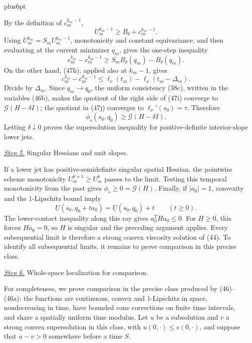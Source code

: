 \documentclass[11pt,reqno]{amsart}
\makeatletter
\theoremstyle{plain}
\theoremstyle{definition}
\theoremstyle{remark}
\renewenvironment{proof}[1][\proofname]{%
  \par
  \pushQED{\qed}%
  \normalfont
  \topsep6pt plus6pt\relax
  \trivlist
  \item[\hskip\labelsep\slshape #1\@addpunct{.}]%
  \ignorespaces
}{%
  \popQED
  \endtrivlist
  \@endpefalse
}
\DeclareRobustCommand{\qed}{%
  \leavevmode\unskip\penalty9999\hbox{}\nobreak
  \ifmmode
    \makebox[0pt][l]{\qquad\hbox{\qedsymbol}}%
  \else
    \qquad\hbox{\qedsymbol}%
  \fi
}
\renewcommand{\qedsymbol}{\rule[.47pt]{4pt}{6pt}}
\numberwithin{equation}{section}
\newcommand{\1}{\mathbf 1}
\makeatother
\begin{document}
\begin{proof}
By the definition of $c_ m^{k_ m-1}$,
\begin{equation*}
U_ m^{k_ m-1}\geq B_ \delta+c_ m^{k_ m-1}.
\end{equation*}
Using $U_ m^{k_ m}=S_ mU_ m^{k_ m-1}$, monotonicity and constant
equivariance, and then evaluating at the current minimizer $q_ m$,
gives the one-step inequality
\begin{equation}
c_ m^{k_ m}-c_ m^{k_ m-1}
\geq S_ mB_ \delta(q_ m)-B_ \delta(q_ m).
\tag{47i}
\end{equation}
On the other hand, (47h), applied also at $k_ m-1$, gives
\begin{equation}
c_ m^{k_ m}-c_ m^{k_ m-1}
\leq\ell_ \nu(t_ m)-\ell_ \nu(t_ m-\Delta_ m).
\tag{47j}
\end{equation}
Divide by $\Delta_ m$.  Since $q_ m\to q_ 0$, the uniform consistency
(38c), written in the variables (46b), makes the quotient of the
right side of (47i) converge to $\mathcal G(H-\delta I)$; the quotient
in (47j) converges to
$\ell_ \nu'(s_ 0)=\tau$.  Therefore
\begin{equation*}
\phi_ s(s_ 0,q_ 0)\geq \mathcal G(H-\delta I).
\end{equation*}
Letting $\delta\downarrow0$ proves the supersolution inequality for
positive-definite interior-slope lower jets.

\smallskip\noindent
\underline{\textit{Step 5.}} Singular Hessians and unit slopes.

If a lower jet has positive-semidefinite singular spatial Hessian, the
pointwise scheme monotonicity $U_ m^{k+1}\geq U_ m^k$ passes to the
limit.  Testing this temporal monotonicity from the past gives
$\phi_ s\geq0=\mathcal G(H)$.  Finally, if $|a_ 0|=1$, convexity and the
$1$-Lipschitz bound imply
\begin{equation*}
\underline U(s_ 0,q_ 0+ta_ 0)=\underline U(s_ 0,q_ 0)+t
\qquad(t\geq0).
\end{equation*}
The lower-contact inequality along this ray gives
$a_ 0^THa_ 0\leq0$.  For $H\geq0$, this forces $Ha_ 0=0$, so $H$
is singular and the preceding argument applies.  Every subsequential
limit is therefore a strong convex viscosity solution of (44).  To
identify all subsequential limits, it remains to prove comparison in
this precise class.

\smallskip\noindent
\underline{\textit{Step 6.}} Whole-space localization for comparison.

For completeness, we prove comparison in the precise class produced by
(46)--(46a): the functions are continuous, convex and $1$-Lipschitz
in space, nondecreasing in time, have bounded cone corrections on
finite time intervals, and share a spatially uniform time modulus.
Let $u$ be a subsolution and $v$ a strong convex supersolution in
this class, with $u(0,\cdot)\leq v(0,\cdot)$, and suppose that
$u-v>0$ somewhere before a time $S$.


\end{proof}
\end{document}
